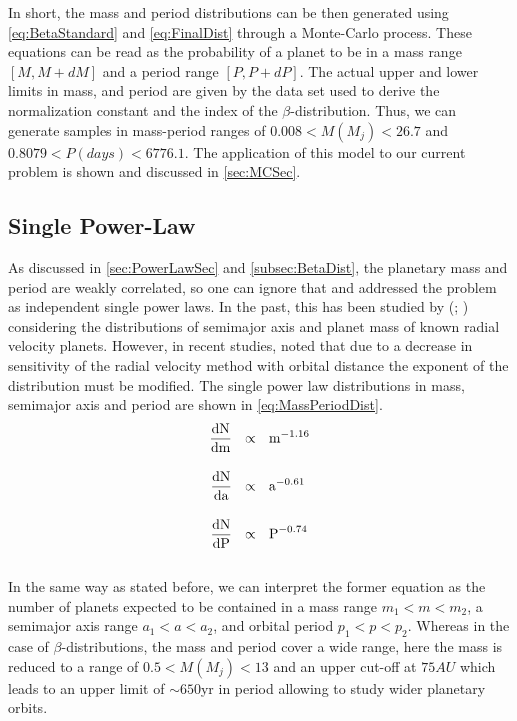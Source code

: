 In short, the mass and period distributions can be then generated using \autoref{eq:BetaStandard} and \autoref{eq:FinalDist} through a Monte-Carlo process. These equations can be read as the probability of a planet to be in a mass range $[M, M + dM]$ and a period range $[P, P + dP]$. The actual upper and lower limits in mass, and period are given by the data set used to derive the normalization constant and the index of the $\beta$-distribution. Thus, we can generate samples in mass-period ranges of $0.008 < M(M_j) < 26.7$ and $0.8079 < P(days) < 6776.1$. The application of this model to our current problem is shown and discussed in \autoref{sec:MCSec}.


\subsection{Single Power-Law}\label{subsec:SPLDist}

As discussed in \autoref{sec:PowerLawSec} and \autoref{subsec:BetaDist}, the planetary mass and period are weakly correlated, so one can ignore that and addressed the problem as independent single power laws. In the past, this has been studied by (\citeyear{2008PASP..120..531C}; \citeyear{2006ApJ...646..505B}) considering the distributions of semimajor axis and planet mass of known radial velocity planets. However, in recent studies, \citeyear{2010EAS....41..107N} noted that due to a decrease in sensitivity of the radial velocity method with orbital distance the exponent of the distribution must be modified. The single power law distributions in mass, semimajor axis and period are shown in \autoref{eq:MassPeriodDist}.\\

\begingroup
\Large
\begin{equation}
  \begin{align*}
    \frac{\textnormal{dN}}{\textnormal{dm}}~~&\propto~~\textnormal{m}^{-1.16} \\[10pt]
    \frac{\textnormal{dN}}{\textnormal{da}}~~&\propto~~\textnormal{a}^{-0.61} \\[10pt]
    \frac{\textnormal{dN}}{\textnormal{dP}}~~&\propto~~\textnormal{P}^{-0.74}
    \label{eq:MassPeriodDist}    
 \end{align*}
\end{equation}
\endgroup\\

In the same way as stated before, we can interpret the former equation as the number of planets expected to be contained in a mass range $m_1 < m < m_2$, a semimajor axis range $a_1 < a < a_2$, and orbital period $p_1 < p < p_2$. Whereas in the case of $\beta$-distributions, the mass and period cover a wide range, here the mass is reduced to a range of $0.5 < M(M_j) < 13$ and an upper cut-off at $75 AU$ which leads to an upper limit of $\sim 650$yr in period allowing to study wider planetary orbits.    

